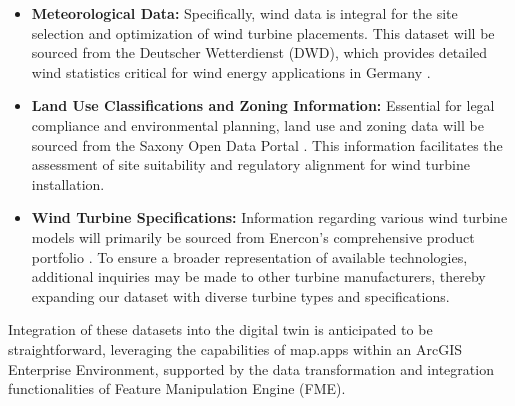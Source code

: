 \documentclass[11pt, titlepage, a4paper]{article}
\begin{document}
\begin{linenumbers}
\begin{itemize}
        \item \textbf{Meteorological Data:} Specifically, wind data is integral for the site selection and optimization of wind turbine placements. This dataset will be sourced from the Deutscher Wetterdienst (DWD), which provides detailed wind statistics critical for wind energy applications in Germany \cite{deutscherwetterdienstWinddatenFurWindenergienutzer}.

        \item \textbf{Land Use Classifications and Zoning Information:} Essential for legal compliance and environmental planning, land use and zoning data will be sourced from the Saxony Open Data Portal \cite{freistaatsachsenOpenDataPortal}. This information facilitates the assessment of site suitability and regulatory alignment for wind turbine installation.

        \item \textbf{Wind Turbine Specifications:} Information regarding various wind turbine models will primarily be sourced from Enercon’s comprehensive product portfolio \cite{enerconglobalgmbhENERCONWindenergieanlagenPortfolio}. To ensure a broader representation of available technologies, additional inquiries may be made to other turbine manufacturers, thereby expanding our dataset with diverse turbine types and specifications.
    \end{itemize}

    Integration of these datasets into the digital twin is anticipated to be straightforward, leveraging the capabilities of map.apps within an ArcGIS Enterprise Environment, supported by the data transformation and integration functionalities of Feature Manipulation Engine (FME).





\end{linenumbers}
\end{document}
